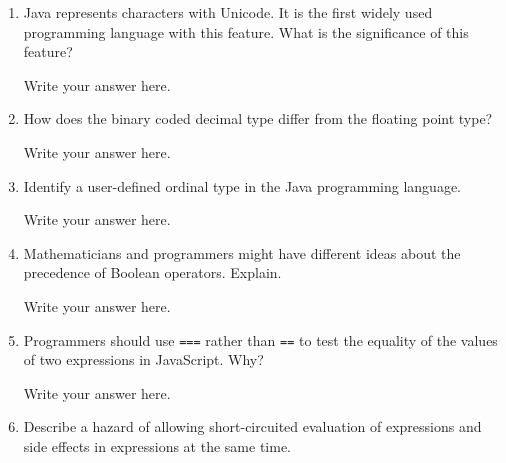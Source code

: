 \begin{enumerate}
  \item Java represents characters with Unicode. It is the first
    widely used programming language with this feature. What is the
    significance of this feature?

  \begin{answer}

    Write your answer here.

    \end{answer}

  \item How does the binary coded decimal type differ from the
    floating point type?

  \begin{answer}

    Write your answer here.

    \end{answer}

  \item Identify a user-defined ordinal type in the Java programming
    language.

  \begin{answer}

    Write your answer here.

    \end{answer}

  \item Mathematicians and programmers might have different ideas
    about the precedence of Boolean operators. Explain.

  \begin{answer}

    Write your answer here.

    \end{answer}

  \item Programmers should use \verb+===+ rather than \verb+==+ to
    test the equality of the values of two expressions in JavaScript. Why?

  \begin{answer}

    Write your answer here.

    \end{answer}

  \item Describe a hazard of allowing short-circuited evaluation
    of expressions and side effects in expressions at the same time.

  \begin{answer}


\end{answer}
\end{enumerate}
